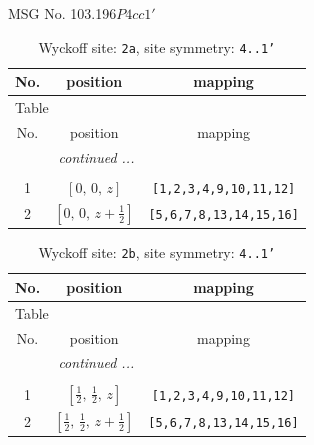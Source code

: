 \documentclass[fleqn,8pt]{jsarticle}
\begin{document}
\setcounter{MaxMatrixCols}{32}

\renewcommand{\tablename}{Table~}
\renewcommand{\figurename}{Figure~}
\begin{center}
\LARGE
MSG No. 103.196\quad$P4cc1'$
\end{center}
\renewcommand{\arraystretch}{1.2}
\begin{longtable}{ccc}
\caption{Wyckoff site: {\tt 2a}, site symmetry: {\tt 4..1'}}
 \\
 \hline \hline
No. & position & mapping \\ \hline \endfirsthead

\multicolumn{2}{l}{\tablename\ \thetable{}} \\
 \hline \hline
No. & position & mapping \\ \hline \endhead

 \hline \hline
\multicolumn{2}{r}{\footnotesize\it continued ...} \\ \endfoot

 \hline \hline
\multicolumn{2}{r}{} \\ \endlastfoot

1 & $\left[ 0,\, 0,\, z \right]$ & {\tt [1,2,3,4,9,10,11,12]} \\ \hline
2 & $\left[ 0,\, 0,\, z + \frac{1}{2} \right]$ & {\tt [5,6,7,8,13,14,15,16]} \\
\end{longtable}
\renewcommand{\arraystretch}{1.2}
\begin{longtable}{ccc}
\caption{Wyckoff site: {\tt 2b}, site symmetry: {\tt 4..1'}}
 \\
 \hline \hline
No. & position & mapping \\ \hline \endfirsthead

\multicolumn{2}{l}{\tablename\ \thetable{}} \\
 \hline \hline
No. & position & mapping \\ \hline \endhead

 \hline \hline
\multicolumn{2}{r}{\footnotesize\it continued ...} \\ \endfoot

 \hline \hline
\multicolumn{2}{r}{} \\ \endlastfoot

1 & $\left[ \frac{1}{2},\, \frac{1}{2},\, z \right]$ & {\tt [1,2,3,4,9,10,11,12]} \\ \hline
2 & $\left[ \frac{1}{2},\, \frac{1}{2},\, z + \frac{1}{2} \right]$ & {\tt [5,6,7,8,13,14,15,16]} \\
\end{longtable}
\end{document}
